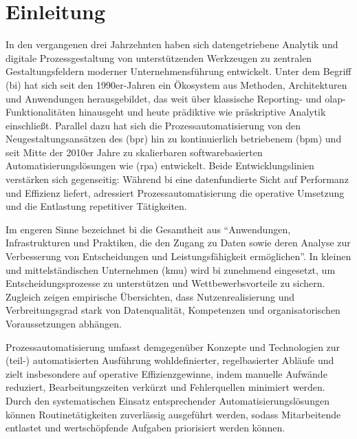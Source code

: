 
\chapter{Einleitung}\label{cap:einleitung}
In den vergangenen drei Jahrzehnten haben sich datengetriebene Analytik und digitale Prozessgestaltung von unterstützenden Werkzeugen zu zentralen Gestaltungsfeldern moderner Unternehmensführung entwickelt. \cite{Fuerst:2019} Unter dem Begriff  (\gls{bi}) hat sich seit den 1990er-Jahren ein Ökosystem aus Methoden, Architekturen und Anwendungen herausgebildet, das weit über klassische Reporting- und \gls{olap}-Funktionalitäten hinausgeht und heute prädiktive wie präskriptive Analytik einschließt. \cite{BaarsKemper:2021} Parallel dazu hat sich die Prozessautomatisierung von den Neugestaltungsansätzen des  (\gls{bpr}) hin zu kontinuierlich betriebenem  (\gls{bpm}) und seit Mitte der 2010er Jahre zu skalierbaren softwarebasierten Automatisierungslösungen wie  (\gls{rpa}) entwickelt. \cite{Allweyer:2020} Beide Entwicklungslinien verstärken sich gegenseitig: Während \gls{bi} eine datenfundierte Sicht auf Performanz und Effizienz liefert, adressiert Prozessautomatisierung die operative Umsetzung und die Entlastung repetitiver Tätigkeiten. \cite{BruckerKleyKykalovaMevius:2020}

Im engeren Sinne bezeichnet \gls{bi} die Gesamtheit aus \enquote{Anwendungen, Infrastrukturen und Praktiken, die den Zugang zu Daten sowie deren Analyse zur Verbesserung von Entscheidungen und Leistungsfähigkeit ermöglichen}. \cite{Gartner:2023} In kleinen und mittelständischen Unternehmen (\gls{kmu}) wird \gls{bi} zunehmend eingesetzt, um Entscheidungsprozesse zu unterstützen und Wettbewerbsvorteile zu sichern. \cite{Frank:2020} Zugleich zeigen empirische Übersichten, dass Nutzenrealisierung und Verbreitungsgrad stark von Datenqualität, Kompetenzen und organisatorischen Voraussetzungen abhängen. \cite{OECD:2021,GiannakisGerogiannisXidonas:2022}

Prozessautomatisierung umfasst demgegenüber Konzepte und Technologien zur (teil-) automatisierten Ausführung wohldefinierter, regelbasierter Abläufe und zielt insbesondere auf operative Effizienzgewinne, indem manuelle Aufwände reduziert, Bearbeitungszeiten verkürzt und Fehlerquellen minimiert werden. \cite{FettkeHouyGutermuth:2020} Durch den systematischen Einsatz entsprechender Automatisierungslösungen können Routinetätigkeiten zuverlässig ausgeführt werden, sodass Mitarbeitende entlastet und wertschöpfende Aufgaben priorisiert werden können. \cite{DrawehnKrauseRennerKintz:2022}

